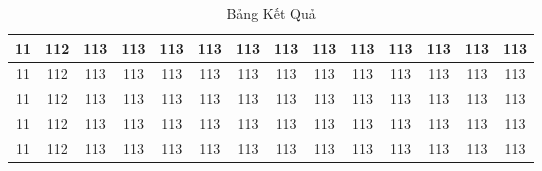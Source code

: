 \begin{landscape}
\begin{table}[H]
{\begin{tabular}{|c|c|c|c|c|c|c|c|c|c|c|c|c|c|}
            \hline
            11                  & 112                        & 113                                              & 113                                              & 113                                              & 113                                              & 113                                              & 113                                              & 113                & 113                & 113                & 113                & 113                & 113                \\
            \hline
            11                  & 112                        & 113                                              & 113                                              & 113                                              & 113                                              & 113                                              & 113                                              & 113                & 113                & 113                & 113                & 113                & 113                \\
            \hline
            11                  & 112                        & 113                                              & 113                                              & 113                                              & 113                                              & 113                                              & 113                                              & 113                & 113                & 113                & 113                & 113                & 113                \\
            \hline
            11                  & 112                        & 113                                              & 113                                              & 113                                              & 113                                              & 113                                              & 113                                              & 113                & 113                & 113                & 113                & 113                & 113                \\
            \hline
            11                  & 112                        & 113                                              & 113                                              & 113                                              & 113                                              & 113                                              & 113                                              & 113                & 113                & 113                & 113                & 113                & 113                \\
            \hline
        \end{tabular}
    }
    \caption{Bảng Kết Quả}
    \label{table:nghia1}
\end{table}
\end{landscape}

